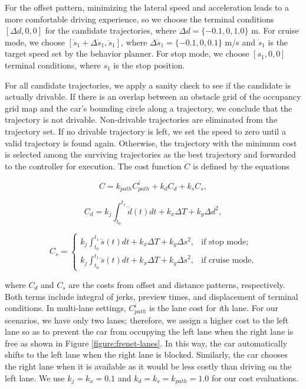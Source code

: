 For the offset pattern, minimizing the lateral speed and acceleration leads to
a more comfortable driving experience, so  we choose the terminal conditions
$[\Delta d, 0, 0]$ for the candidate trajectories, where $\Delta d = \{-0.1, 0,
1.0\}$ m. For cruise mode, we choose $[\dot{s}_1 + \Delta \dot{s}_1,
\ddot{s}_1]$, where $\Delta \dot{s}_1 = \{-0.1, 0, 0.1\}$ m/s and $\dot{s}_1$
is the target speed set by the behavior planner. For stop mode, we choose
$[s_1, 0, 0]$ terminal conditions, where $s_1$ is the stop position.

For all candidate trajectories, we apply a sanity check to see if the candidate
is actually drivable. If there is an overlap between an obstacle grid of the
occupancy grid map and the car's bounding circle along a trajectory, we
conclude that the trajectory is not drivable. Non-drivable trajectories are
eliminated from the trajectory set. If no drivable trajectory is left, we set
the speed to zero until a valid trajectory is found again. Otherwise, the
trajectory with the minimum cost is selected among the surviving trajectories
as the best trajectory and forwarded to the controller for execution. The cost
function $C$ is defined by the equations

\begin{equation}
  C = k_{path}C^i_{path} + k_dC_d + k_sC_s,
\label{eq:cost1}
\end{equation}

\begin{equation}
  C_d = k_j\int_{t_0}^{t_1}\dddot{d}(t)dt + k_x\Delta T + k_y\Delta d^2,
\label{eq:cost2}
\end{equation}

\begin{equation}
  C_s =
  \begin{cases}
    k_j\int_{t_0}^{t_1}\dddot{s}(t)dt + k_x\Delta T + k_y\Delta s^2,
    &\text{if stop mode;} \\
    k_j\int_{t_0}^{t_1}\dddot{s}(t)dt + k_x\Delta T + k_y\Delta \dot{s}^2,
    &\text{if cruise mode,}
  \end{cases}
  \label{eq:cost3}
\end{equation}

where $C_d$ and $C_s$ are the costs from offset and distance patterns,
respectively. Both terms include integral of jerks, preview times, and
displacement of terminal conditions. In multi-lane settings, $C^i_{path}$ is
the lane cost for \textit{i}th lane. For our scenarios, we have only two lanes;
therefore, we assign a higher cost to the left lane so as to prevent the car
from occupying the left lane when the right lane is free as shown in Figure
\ref{figure:frenet-lanes}. In this way, the car automatically shifts to the
left lane when the right lane is blocked. Similarly, the car chooses the right
lane when it is available as it would be less costly than driving on the left
lane. We use $k_j = k_x = 0.1$ and $k_d = k_s = k_{path} = 1.0$ for our cost
evaluations.

